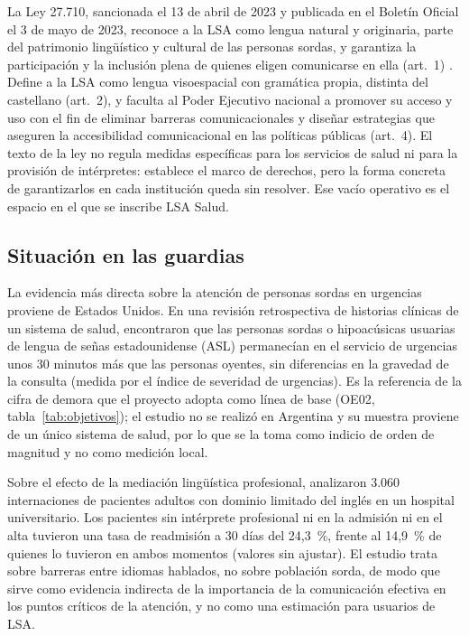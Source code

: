 La Ley 27.710, sancionada el 13 de abril de 2023 y publicada en el Boletín Oficial el 3 de mayo de 2023, reconoce a la LSA como lengua natural y originaria, parte del patrimonio lingüístico y cultural de las personas sordas, y garantiza la participación y la inclusión plena de quienes eligen comunicarse en ella (art.~1) \parencite{ley27710}. Define a la LSA como lengua visoespacial con gramática propia, distinta del castellano (art.~2), y faculta al Poder Ejecutivo nacional a promover su acceso y uso con el fin de eliminar barreras comunicacionales y diseñar estrategias que aseguren la accesibilidad comunicacional en las políticas públicas (art.~4). El texto de la ley no regula medidas específicas para los servicios de salud ni para la provisión de intérpretes: establece el marco de derechos, pero la forma concreta de garantizarlos en cada institución queda sin resolver. Ese vacío operativo es el espacio en el que se inscribe LSA Salud.

\subsection{Situación en las guardias}\label{sec:guardias}

La evidencia más directa sobre la atención de personas sordas en urgencias proviene de Estados Unidos. En una revisión retrospectiva de historias clínicas de un sistema de salud, \textcite{james2022ed} encontraron que las personas sordas o hipoacúsicas usuarias de lengua de señas estadounidense (ASL) permanecían en el servicio de urgencias unos 30 minutos más que las personas oyentes, sin diferencias en la gravedad de la consulta (medida por el índice de severidad de urgencias). Es la referencia de la cifra de demora que el proyecto adopta como línea de base (OE02, tabla~\ref{tab:objetivos}); el estudio no se realizó en Argentina y su muestra proviene de un único sistema de salud, por lo que se la toma como indicio de orden de magnitud y no como medición local.

Sobre el efecto de la mediación lingüística profesional, \textcite{lindholm2012} analizaron 3.060 internaciones de pacientes adultos con dominio limitado del inglés en un hospital universitario. Los pacientes sin intérprete profesional ni en la admisión ni en el alta tuvieron una tasa de readmisión a 30 días del 24,3~\%, frente al 14,9~\% de quienes lo tuvieron en ambos momentos (valores sin ajustar). El estudio trata sobre barreras entre idiomas hablados, no sobre población sorda, de modo que sirve como evidencia indirecta de la importancia de la comunicación efectiva en los puntos críticos de la atención, y no como una estimación para usuarios de LSA.

